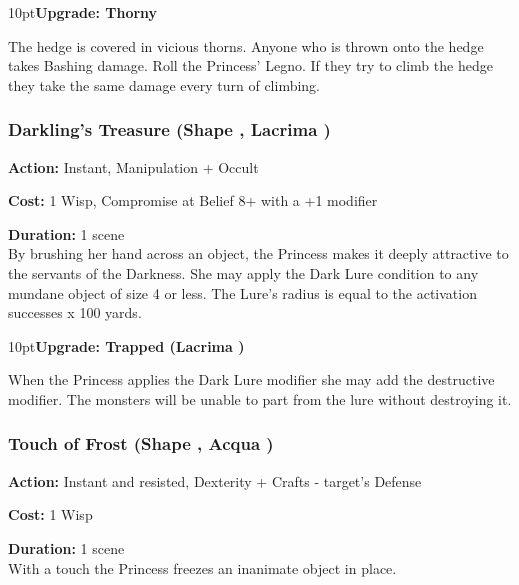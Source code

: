 \begin{myindentpar}{10pt}\textbf{Upgrade: Thorny}

The hedge is covered in vicious thorns. Anyone who is thrown onto the hedge takes Bashing damage. Roll the Princess' Legno. If they try to climb the hedge they take the same damage every turn of climbing.\end{myindentpar}

\subsubsection*{Darkling's Treasure (Shape \textbullet\textbullet, Lacrima \textbullet)}

\noindent \textbf{Action:} Instant, Manipulation + Occult

\noindent \textbf{Cost:} 1 Wisp, Compromise at Belief 8+ with a +1 modifier

\noindent \textbf{Duration:} 1 scene \\

\noindent By brushing her hand across an object, the Princess makes it deeply attractive to the servants of the Darkness. She may apply the Dark Lure condition to any mundane object of size 4 or less. The Lure's radius is equal to the activation successes x 100 yards.

\begin{myindentpar}{10pt}\textbf{Upgrade: Trapped (Lacrima \textbullet\textbullet)}

When the Princess applies the Dark Lure modifier she may add the destructive modifier. The monsters will be unable to part from the lure without destroying it.\end{myindentpar}


\subsubsection*{Touch of Frost (Shape \textbullet\textbullet, Acqua \textbullet)}
\noindent \textbf{Action:} Instant and resisted, Dexterity + Crafts - target's Defense

\noindent \textbf{Cost:} 1 Wisp

\noindent \textbf{Duration:} 1 scene\\

\noindent With a touch the Princess freezes an inanimate object in place.

